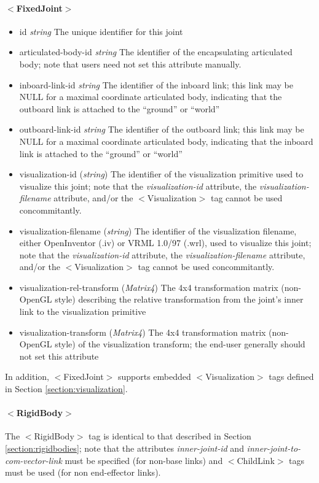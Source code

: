 \documentclass{article}
\begin{document}
\begin{landscape}
\begin{itemize}
\paragraph{$<$FixedJoint$>$}
\begin{itemize}
 \item id  \emph{string}  The unique identifier for this joint
 \item articulated-body-id  \emph{string} The identifier of the encapsulating articulated body; note that users need not set this attribute manually.
\item inboard-link-id  \emph{string} The identifier of the inboard link; this link may be NULL for a maximal coordinate articulated body, indicating that the outboard link is attached to the ``ground'' or ``world''
\item outboard-link-id  \emph{string} The identifier of the outboard link; this link may be NULL for a maximal coordinate articulated body, indicating that the inboard link is attached to the ``ground'' or ``world''
\item visualization-id (\emph{string})  The identifier of the visualization primitive used to visualize this joint; note that the \emph{visualization-id} attribute, the \emph{visualization-filename} attribute, and/or the $<$Visualization$>$ tag cannot be used concommitantly.
\item visualization-filename (\emph{string})  The identifier of the visualization filename, either OpenInventor (.iv) or VRML 1.0/97 (.wrl), used to visualize this joint; note that the \emph{visualization-id} attribute, the \emph{visualization-filename} attribute, and/or the $<$Visualization$>$ tag cannot be used concommitantly.
\item visualization-rel-transform (\emph{Matrix4})  The 4x4 transformation matrix (non-OpenGL style) describing the relative transformation from the joint's inner link to the visualization primitive
\item visualization-transform (\emph{Matrix4})  The 4x4 transformation matrix (non-OpenGL style) of the visualization transform; the end-user generally should not set this attribute
\end{itemize}

In addition, $<$FixedJoint$>$ supports embedded $<$Visualization$>$ tags defined in Section \ref{section:visualization}.

\paragraph{$<$RigidBody$>$}
The $<$RigidBody$>$ tag is identical to that described in Section \ref{section:rigidbodies}; note that the attributes \emph{inner-joint-id} and \emph{inner-joint-to-com-vector-link} must be specified (for non-base links) and  $<$ChildLink$>$ tags must be used (for non end-effector links).


\end{itemize}
\end{landscape}
\end{document}
